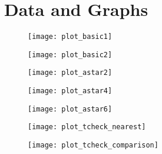 \documentclass[sigconf]{aamas}  %
\begin{document}

\maketitle








\newpage

\appendix
\section{Data and Graphs}

\begin{figure}
\texttt{[image: plot\_basic1]}
\end{figure}

\begin{figure}
\texttt{[image: plot\_basic2]}
\end{figure}

\begin{figure}
\texttt{[image: plot\_astar2]}
\end{figure}

\begin{figure}
\texttt{[image: plot\_astar4]}
\end{figure}

\begin{figure}
\texttt{[image: plot\_astar6]}
\end{figure}

\begin{figure}
\texttt{[image: plot\_tcheck\_nearest]}
\end{figure}

\begin{figure}
\texttt{[image: plot\_tcheck\_comparison]}
\end{figure}
\end{document}
